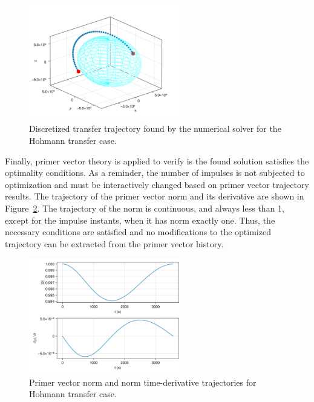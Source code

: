 \begin{figure}[htbp]
    \centering
    \includegraphics[width=0.6\textwidth]{img/hohmann_solved.png}
    \caption{Discretized transfer trajectory found by the numerical solver for the Hohmann transfer case.}
    \label{fig:hohmann_traj}
\end{figure}

Finally, primer vector theory is applied to verify is the found solution satisfies the optimality conditions. As a reminder, the number of impulses is not subjected to optimization and must be interactively changed based on primer vector trajectory results. The trajectory of the primer vector norm and its derivative are shown in Figure~\ref{fig:hohmann_primer_vec}. The trajectory of the norm is continuous, and always less than 1, except for the impulse instants, when it has norm exactly one. Thus, the necessary conditions are satisfied and no modifications to the optimized trajectory can be extracted from the primer vector history.

\begin{figure}[htbp]
    \centering
    \includegraphics[width=0.6\textwidth]{img/hohmann_primer_vector_history.png}
    \caption{Primer vector norm and norm time-derivative trajectories for Hohmann transfer case.}
    \label{fig:hohmann_primer_vec}
\end{figure}